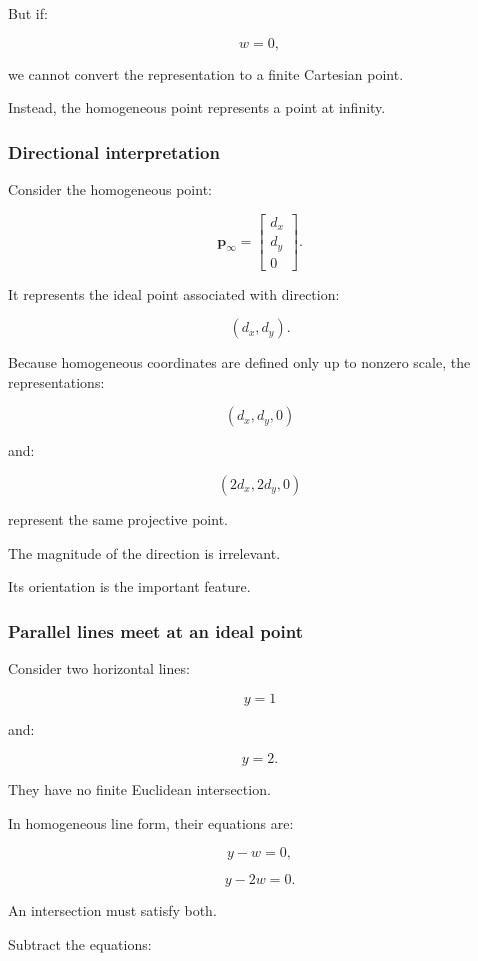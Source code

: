 But if:

\[
 \boxed{w=0},
\]

we cannot convert the representation to a finite Cartesian point.

Instead, the homogeneous point represents a point at infinity.

\subsubsection{Directional interpretation}\label{02-foundations-ii-ch032-directional-interpretation}

Consider the homogeneous point:

\[
 \boxed{ \mathbf p_\infty= \begin{bmatrix} d_x\\d_y\\0 \end{bmatrix} }.
\]

It represents the ideal point associated with direction:

\[
 (d_x,d_y).
\]

Because homogeneous coordinates are defined only up to nonzero scale, the representations:

\[
 (d_x,d_y,0)
\]

and:

\[
 (2d_x,2d_y,0)
\]

represent the same projective point.

The magnitude of the direction is irrelevant.

Its orientation is the important feature.

\subsubsection{Parallel lines meet at an ideal point}\label{02-foundations-ii-ch032-parallel-lines-meet-at-an-ideal-point}

Consider two horizontal lines:

\[
 y=1
\]

and:

\[
 y=2.
\]

They have no finite Euclidean intersection.

In homogeneous line form, their equations are:

\[
 y-w=0,
\]

\[
 y-2w=0.
\]

An intersection must satisfy both.

Subtract the equations:

